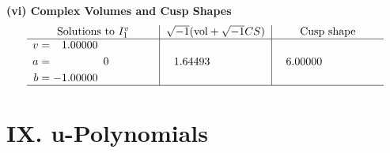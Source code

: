 \documentclass[1p]{elsarticle_modified}
\theoremstyle{definition}
\newcommand{\I}{\sqrt{-1}}
\begin{document}
\newpage\flushleft \textbf{(vi) Complex Volumes and Cusp Shapes}
$$\begin{array}{c|c|c}  
\text{Solutions to }I^v_{1}& \I (\text{vol} + \sqrt{-1}CS) & \text{Cusp shape}\\
 \hline 
\begin{aligned}
v &= \phantom{-}1.00000\phantom{ +0.000000I} \\
a &= \phantom{-0.000000 } 0 \\
b &= -1.00000\phantom{ +0.000000I}\end{aligned}
 & \phantom{-}1.64493\phantom{ +0.000000I} & \phantom{-}6.00000\phantom{ +0.000000I}\\
 \hline 
 \end{array}$$\newpage
\newpage\renewcommand{\arraystretch}{1}
\centering \section*{ IX. u-Polynomials}
\end{document}
